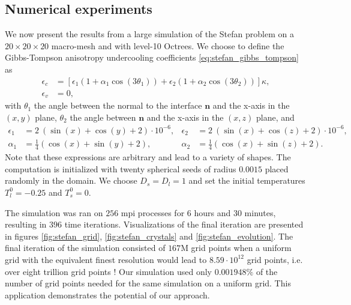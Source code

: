\subsection{Numerical experiments}
We now present the results from a large simulation of the Stefan problem on a $20\times20\times20$ macro-mesh and with level-10 Octrees. We choose to define the Gibbs-Tompson anisotropy undercooling coefficients \eqref{eq:stefan_gibbs_tompson} as
\begin{align*}
\epsilon_c & = \left[ \epsilon_1 \left( 1+\alpha_1 \cos(3\theta_1) \right) + \epsilon_2 \left( 1+\alpha_2 \cos(3\theta_2) \right) \right] \kappa,\\
\epsilon_v & = 0,
\end{align*}
with $\theta_1$ the angle between the normal to the interface $\mathbf{n}$ and the x-axis in the $(x,y)$ plane, $\theta_2$ the angle between $\mathbf{n}$ and the x-axis in the $(x,z)$ plane, and
\begin{align*}
\epsilon_1 & = 2~(\sin(x)+\cos(y)+2)\cdot10^{-6}, & \epsilon_2 & = 2~(\sin(x)+\cos(z)+2)\cdot10^{-6}, \\
\alpha_1 & = \frac{1}{4}(\cos(x)+\sin(y)+2), & \alpha_2 & = \frac{1}{4}(\cos(x)+\sin(z)+2).
\end{align*}
Note that these expressions are arbitrary and lead to a variety of shapes. The computation is initialized with twenty spherical seeds of radius $0.0015$ placed randomly in the domain. We choose $D_s=D_l=1$ and set the initial temperatures $T^0_l=-0.25$ and $T^0_s=0$.

The simulation was ran on $256$ mpi processes for $6$ hours and $30$ minutes, resulting in $396$ time iterations. Visualizations of the final iteration are presented in figures \ref{fig:stefan_grid}, \ref{fig:stefan_crystals} and \ref{fig:stefan_evolution}. The final iteration of the simulation consisted of $167$M grid points when a uniform grid with the equivalent finest resolution would lead to $8.59\cdot10^{12}$ grid points, i.e. over eight trillion grid points ! Our simulation used only $0.001948\%$  of the number of grid points needed for the same simulation on a uniform grid. This application demonstrates the potential of our approach.

